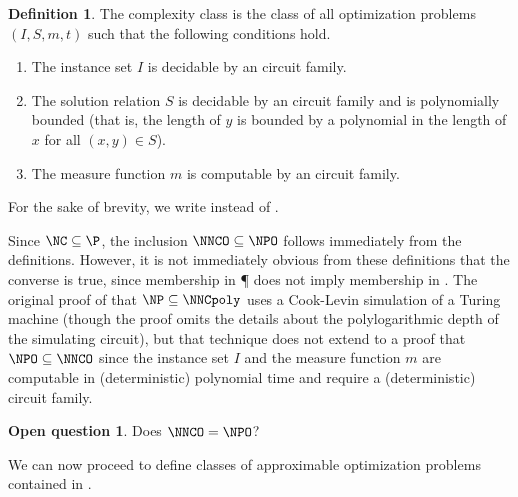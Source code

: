 \documentclass[]{article}
\theoremstyle{plain}
\theoremstyle{definition}
\newtheorem{definition}{Definition}
\newtheorem{openquestion}{Open question}
\begin{document}
\begin{definition}\label{def:nnco}
  The complexity class \NNCOpoly{} is the class of all optimization problems $(I, S, m, t)$ such that the following conditions hold.
  \begin{enumerate}
  \item The instance set $I$ is decidable by an \NC{} circuit family.
  \item The solution relation $S$ is decidable by an \NC{} circuit family and is polynomially bounded (that is, the length of $y$ is bounded by a polynomial in the length of $x$ for all $(x, y)\in S$).
  \item The measure function $m$ is computable by an \FNC{} circuit family.
  \end{enumerate}
  For the sake of brevity, we write \NNCO{} instead of \NNCOpoly{}.
\end{definition}

Since $\NC\subseteq\P$, the inclusion $\NNCO\subseteq\NPO$ follows immediately from the definitions.
However, it is not immediately obvious from these definitions that the converse is true, since membership in \P{} does not imply membership in \NC.
The original proof of \cite{wolf94} that $\NP\subseteq\NNCpoly$ uses a Cook-Levin simulation of a Turing machine (though the proof omits the details about the polylogarithmic depth of the simulating circuit), but that technique does not extend to a proof that $\NPO\subseteq\NNCO$ since the instance set $I$ and the measure function $m$ are computable in (deterministic) polynomial time and require a (deterministic) \NC{} circuit family.

\begin{openquestion}
  Does $\NNCO=\NPO$?
\end{openquestion}

We can now proceed to define classes of approximable optimization problems contained in \NNCO.
\end{document}
